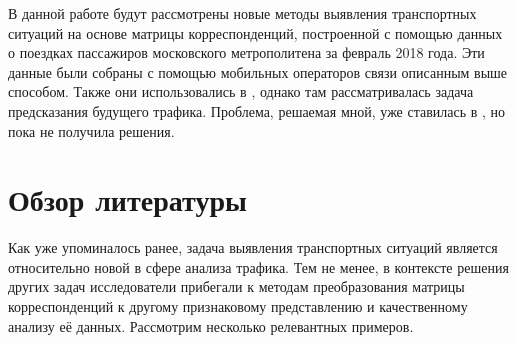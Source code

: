 \documentclass[12pt, fleqn, titlepage]{article}
\begin{document}
    В данной работе будут рассмотрены новые методы выявления транспортных ситуаций на основе матрицы корреспонденций, построенной 
    с помощью данных о поездках пассажиров московского метрополитена за февраль 2018 года. Эти данные были собраны с помощью 
    мобильных операторов связи описанным выше способом. Также они использовались в \cite{namiot2020, necr2019}, 
    однако там рассматривалась задача предсказания будущего трафика. Проблема, решаемая мной, уже ставилась в \cite{namiot2021}, 
    но пока не получила решения.

    \section{Обзор литературы}

    Как уже упоминалось ранее, задача выявления транспортных ситуаций является относительно новой в сфере анализа трафика. 
    Тем не менее, в контексте решения других задач исследователи прибегали к методам преобразования матрицы корреспонденций к 
    другому признаковому представлению и качественному анализу её данных. Рассмотрим несколько релевантных примеров.
\end{document}
